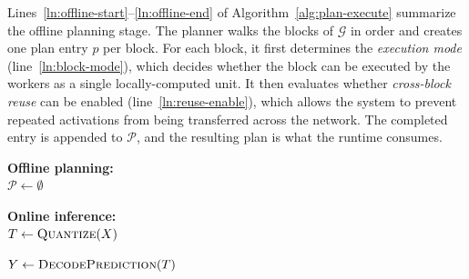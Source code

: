 Lines~\ref{ln:offline-start}--\ref{ln:offline-end} of Algorithm~\ref{alg:plan-execute} summarize the offline planning stage.
The planner walks the blocks of $\mathcal{G}$ in order and creates one plan entry $p$ per block.
For each block, it first determines the \emph{execution mode} (line~\ref{ln:block-mode}), which decides whether the block can be executed by the workers as a single locally-computed unit.
It then evaluates whether \emph{cross-block reuse} can be enabled (line~\ref{ln:reuse-enable}), which allows the system to prevent repeated activations from being transferred across the network.
The completed entry is appended to $\mathcal{P}$, and the resulting plan is what the runtime consumes.


\begin{algorithm}[t]
\small
\caption{The communication-aware execution planning and inference in our proposed framework}
\label{alg:plan-execute}

\textbf{Offline planning:}\\
$\mathcal{P}\gets\emptyset$ \label{ln:offline-start}\\

\textbf{Online inference:}\\
$T\gets\textsc{Quantize}(X)$ \label{ln:online-start}\\

$Y\gets\textsc{DecodePrediction}(T)$ \label{ln:online-end}\\
\end{algorithm}

